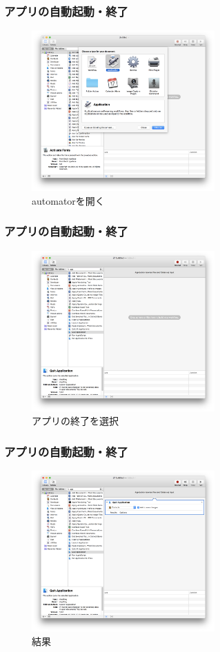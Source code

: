 \documentclass[10pt, dvipdfmx]{beamer}
\begin{document}
        \begin{frame}
            \frametitle{アプリの自動起動・終了}
                \begin{figure}[htb]
                    \includegraphics[width=70mm]{images/app-10.png}
                    \caption{automatorを開く}
                    \label{fig:17}
                \end{figure}
        \end{frame}

        \begin{frame}
            \frametitle{アプリの自動起動・終了}
                \begin{figure}[htb]
                    \includegraphics[width=70mm]{images/app-11.png}
                    \caption{アプリの終了を選択}
                    \label{fig:18}
                \end{figure}
        \end{frame}

        \begin{frame}
            \frametitle{アプリの自動起動・終了}
                \begin{figure}[htb]
                    \includegraphics[width=70mm]{images/app-12.png}
                    \caption{結果}
                    \label{fig:19}
                \end{figure}
        \end{frame}
\end{document}
